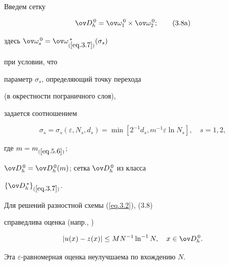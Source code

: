 Введем сетку \cite{6}


\begin{equation} \label{eq.3.8}


\ov D^{\,0}_h=\ov\omega^{\,0}_1\times \ov\omega^{\,0}_2;\tag{3.8a}


\end{equation}


здесь $\ov\omega^{\,0}_s=\ov\omega^{\,*}_{(\ref{eq.3.7})}(\sigma_s)$


при условии, что


параметр $\sigma_s$, определяющий точку перехода


(в окрестности пограничного слоя),


задается соотношением


\begin{equation}\label{eq.3.8b}


\sigma_s=\sigma_s(\varepsilon,N_s,d_s)=


\min [2^{-1}d_s,m^{-1}\varepsilon \ln N_s], \quad s=1,2,\tag{3.8б}


\end{equation}


где $m=m_{(\ref{eq.5.6})}$;


$\ov D^{\,0}_h=\ov D^{\,0}_h(m)$; сетка $\ov D^{\,0}_h$ из класса


$\{\ov D^{\,*}_h\}_{(\ref{eq.3.7})}$.


\addtocounter{equation}{2}





Для решений разностной схемы (\ref{eq.3.2}), (3.8)


справедлива оценка (напр., \cite{6})


\begin{equation}\label{eq.3.9}


|u(x)-z(x)|\le M N^{-1}\ln^{-1} N,  \quad x\in \ov D^{\,0}_h.


\end{equation}


Эта $\varepsilon$-равномерная оценка неулучшаема по вхождению $N$.





